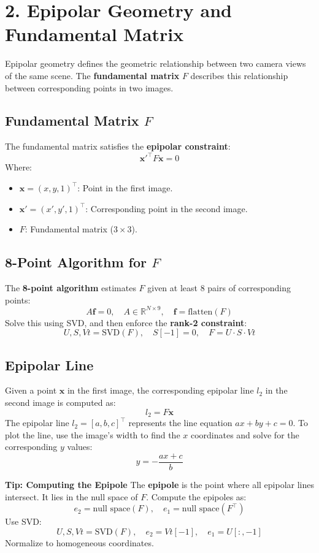 \documentclass[a4paper,10pt]{article}
\begin{document}
\section*{2. Epipolar Geometry and Fundamental Matrix}

Epipolar geometry defines the geometric relationship between two camera views of the same scene. The \textbf{fundamental matrix} $F$ describes this relationship between corresponding points in two images.

\subsection*{Fundamental Matrix $F$}
The fundamental matrix satisfies the \textbf{epipolar constraint}:
\[
\mathbf{x'}^\top F \mathbf{x} = 0
\]
Where:
\begin{itemize}
    \item $\mathbf{x} = (x, y, 1)^\top$: Point in the first image.
    \item $\mathbf{x'} = (x', y', 1)^\top$: Corresponding point in the second image.
    \item $F$: Fundamental matrix ($3 \times 3$).
\end{itemize}

\subsection*{8-Point Algorithm for $F$}
The \textbf{8-point algorithm} estimates $F$ given at least 8 pairs of corresponding points:
\[
A \mathbf{f} = 0, \quad A \in \mathbb{R}^{N \times 9}, \quad \mathbf{f} = \text{flatten}(F)
\]
Solve this using SVD, and then enforce the \textbf{rank-2 constraint}:
\[
U, S, Vt = \text{SVD}(F), \quad S[-1] = 0, \quad F = U \cdot S \cdot Vt
\]

\subsection*{Epipolar Line}
Given a point $\mathbf{x}$ in the first image, the corresponding epipolar line $l_2$ in the second image is computed as:
\[
l_2 = F \mathbf{x}
\]
The epipolar line $l_2 = [a, b, c]^\top$ represents the line equation $ax + by + c = 0$. To plot the line, use the image's width to find the $x$ coordinates and solve for the corresponding $y$ values:
\[
y = -\frac{a x + c}{b}
\]

\textbf{Tip: Computing the Epipole}
The \textbf{epipole} is the point where all epipolar lines intersect. It lies in the null space of $F$. Compute the epipoles as:
\[
e_2 = \text{null space}(F), \quad e_1 = \text{null space}(F^\top)
\]
Use SVD:
\[
U, S, Vt = \text{SVD}(F), \quad e_2 = Vt[-1], \quad e_1 = U[:, -1]
\]
Normalize to homogeneous coordinates.
\end{document}
